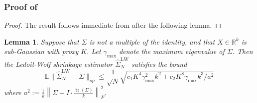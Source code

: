\documentclass{article} %
\newcommand{\R}{\mathbb{R}}
\newcommand{\Ex}{\mathbb{E}}
\DeclareMathOperator{\tr}{tr}
\newtheorem{lemma}[lemma]{Lemma}
\newcommand{\wh}[1]{\widehat{#1}}
\begin{document}
\subsubsection{Proof of }
\begin{proof}
The result follows immediate from  after the following lemma.
\end{proof}
\begin{lemma}
    Suppose that $\Sigma$ is not a multiple of the identity, and that $X\in\R^k$ is sub-Gaussian with proxy $K$. Let $\gamma_{\max}$ denote the maximum eigenvalue of $\Sigma$. Then the Ledoit-Wolf shrinkage estimator $\widehat{\Sigma}_N^\text{LW}$ satisfies the bound
    \[
    \Ex \|\wh{\Sigma}_N^\text{LW}-\Sigma\|_{op} \leq \frac{1}{\sqrt{N}}\sqrt{c_1K^4\gamma_{\max}^2 k^2 + c_2 K^8 \gamma_{\max} k^3/a^2}
    \]
    where $a^2:=\frac{1}{k}\left\|\Sigma - I\cdot \frac{\tr(\Sigma)}{k}\right\|_F^2$.
\end{lemma}
\end{document}
